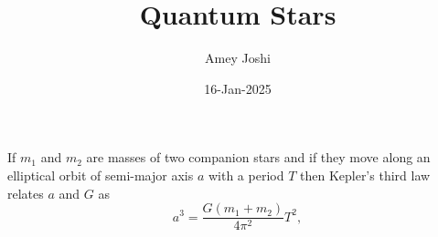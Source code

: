 \documentclass{beamer}
\begin{document}
\title{Quantum Stars}
\author{Amey Joshi}
\date{16-Jan-2025}
\frame{\titlepage}
\begin{frame}
\item If $m_1$ and $m_2$ are masses of two companion stars and if they
move along an elliptical orbit of semi-major axis $a$ with a period $T$
then Kepler's third law relates $a$ and $G$ as
\begin{equation}
a^3 = \frac{G(m_1 + m_2)}{4\pi^2}T^2,
\end{equation}
\end{frame}
\end{document}
